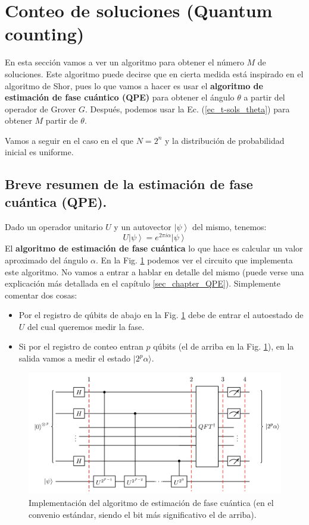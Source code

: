 \documentclass[a4paper,11pt]{book} %
\numberwithin{equation}{chapter}
\begin{document}
\section{Conteo de soluciones (Quantum counting)} \label{sec_quantum_counting}


En esta sección vamos a ver un algoritmo para obtener el número $M$ de soluciones. Este algoritmo puede decirse que en cierta medida está inspirado en el algoritmo de Shor, pues lo que vamos a hacer es usar el \textbf{algoritmo de estimación de fase cuántico (QPE)} para obtener el ángulo $\theta$ a partir del operador de Grover $G$. Después, podemos usar la Ec. (\ref{ec_t-sols_theta}) para obtener $M$ partir de $\theta$.

Vamos a seguir en el caso en el que $N=2^n$ y la distribución de probabilidad inicial es uniforme.

\subsection{Breve resumen de la estimación de fase cuántica (QPE).}

Dado un operador unitario $U$ y un autovector $\left| \psi \right\rangle$ del mismo, tenemos:
$$
U \left| \psi \right\rangle = e^{2 \pi i \alpha}  \left| \psi \right\rangle
$$
El \textbf{algoritmo de estimación de fase cuántica} lo que hace es calcular un valor aproximado del ángulo $\alpha$.
En la Fig. \ref{Fig_QC_QPE} podemos ver el circuito que implementa este algoritmo. No vamos a entrar a hablar en detalle del mismo (puede verse una explicación más detallada en el capítulo \ref{sec_chapter_QPE}). Simplemente comentar dos cosas:
\begin{itemize}
	\item Por el registro de qúbits de abajo en la Fig. \ref{Fig_QC_QPE} debe de entrar el autoestado de $U$ del cual queremos medir la fase.
	
	\item Si por el registro de conteo entran $p$ qúbits (el de arriba en la Fig. \ref{Fig_QC_QPE}), en la salida vamos a medir el estado $| 2^p \alpha \rangle$.
\end{itemize}

	\begin{figure}[h] 
	\centering 
	\includegraphics[width=0.8\linewidth]{Figuras/Fig_QC_QPE.png}
	\caption{Implementación del algoritmo de estimación de fase cuántica (en el convenio estándar, siendo el bit más significativo el de arriba).}
	\label{Fig_QC_QPE}
	\end{figure}
\end{document}
